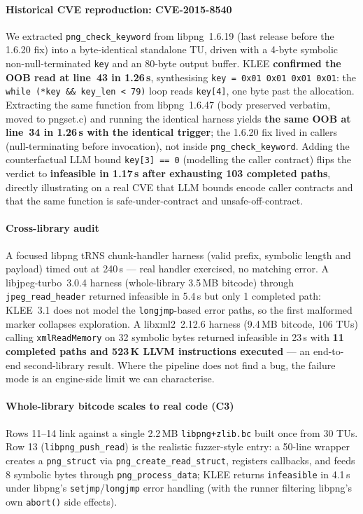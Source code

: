 \documentclass[3p,times,procedia]{elsarticle}
\begin{document}
\paragraph{Historical CVE reproduction: CVE-2015-8540 \cite{cve20158540}} We extracted \texttt{png\_check\_keyword} from libpng~1.6.19 (last release before the 1.6.20 fix) into a byte-identical standalone TU, driven with a 4-byte symbolic non-null-terminated \texttt{key} and an 80-byte output buffer. KLEE \textbf{confirmed the OOB read at line~43 in 1.26\,s}, synthesising \texttt{key = 0x01\,0x01\,0x01\,0x01}: the \texttt{while (*key \&\& key\_len < 79)} loop reads \texttt{key[4]}, one byte past the allocation. Extracting the same function from libpng~1.6.47 (body preserved verbatim, moved to pngset.c) and running the identical harness yields \textbf{the same OOB at line~34 in 1.26\,s with the identical trigger}; the 1.6.20 fix lived in callers (null-terminating before invocation), not inside \texttt{png\_check\_keyword}. Adding the counterfactual LLM bound \texttt{key[3] == 0} (modelling the caller contract) flips the verdict to \textbf{infeasible in 1.17\,s after exhausting 103 completed paths}, directly illustrating on a real CVE that LLM bounds encode caller contracts and that the same function is safe-under-contract and unsafe-off-contract.

\paragraph{Cross-library audit} A focused libpng tRNS chunk-handler harness (valid prefix, symbolic length and payload) timed out at 240\,s --- real handler exercised, no matching error. A libjpeg-turbo~3.0.4 harness (whole-library 3.5\,MB bitcode) through \texttt{jpeg\_read\_header} returned infeasible in 5.4\,s but only 1 completed path: KLEE~3.1 does not model the \texttt{longjmp}-based error paths, so the first malformed marker collapses exploration. A libxml2~2.12.6 harness (9.4\,MB bitcode, 106 TUs) calling \texttt{xmlReadMemory} on 32 symbolic bytes returned infeasible in 23\,s with \textbf{11 completed paths and 523\,K LLVM instructions executed} --- an end-to-end second-library result. Where the pipeline does not find a bug, the failure mode is an engine-side limit we can characterise.

\paragraph{Whole-library bitcode scales to real code (C3)} Rows 11--14 link against a single 2.2\,MB \texttt{libpng+zlib.bc} built once from 30 TUs. Row 13 (\texttt{libpng\_push\_read}) is the realistic fuzzer-style entry: a 50-line wrapper creates a \texttt{png\_struct} via \texttt{png\_create\_read\_struct}, registers callbacks, and feeds 8 symbolic bytes through \texttt{png\_process\_data}; KLEE returns \texttt{infeasible} in 4.1\,s under libpng's \texttt{setjmp}/\texttt{longjmp} error handling (with the runner filtering libpng's own \texttt{abort()} side effects).
\end{document}
